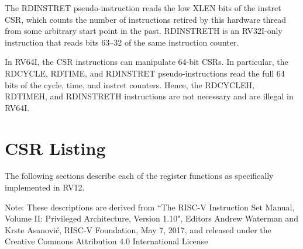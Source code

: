 The RDINSTRET pseudo-instruction reads the low XLEN bits of the instret
CSR, which counts the number of instructions retired by this hardware
thread from some arbitrary start point in the past. RDINSTRETH is an
RV32I-only instruction that reads bits 63--32 of the same instruction
counter.

In RV64I, the CSR instructions can manipulate 64-bit CSRs. In
particular, the RDCYCLE, RDTIME, and RDINSTRET pseudo-instructions read
the full 64 bits of the cycle, time, and instret counters. Hence, the
RDCYCLEH, RDTIMEH, and RDINSTRETH instructions are not necessary and are
illegal in RV64I.

\section{CSR Listing}\label{csr-listing}

The following sections describe each of the register functions as
specifically implemented in RV12.

Note: These descriptions are derived from ``The RISC-V Instruction Set
Manual, Volume II: Privileged Architecture, Version 1.10", Editors
Andrew Waterman and Krste Asanović, RISC-V Foundation, May 7, 2017,
and released under the Creative Commons Attribution 4.0 International
License

